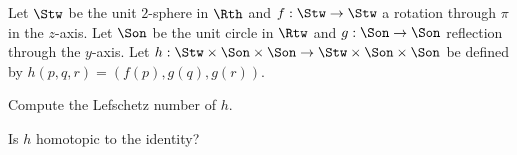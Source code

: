 Let $\Stw$ be the unit $2$-sphere in $\Rth$ and $f:\Stw\rightarrow
\Stw$ a rotation through $\pi$ in the $z$-axis. Let $\Son$ be the unit
circle in $\Rtw$ and $g:\Son\rightarrow \Son$ reflection through the
$y$-axis. Let $h:\Stw\times \Son\times \Son\rightarrow \Stw\times
\Son\times \Son$ be defined by $h(p,q,r)=(f(p),g(q),g(r))$. 
\begin{alist}
\item Compute the Lefschetz number of $h$.
\item Is $h$ homotopic to the identity?
\end{alist}

